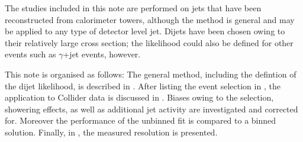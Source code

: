 The studies included in this note are performed on jets that have been reconstructed from calorimeter towers, although the method is general and may be applied to any type of detector level jet.
Dijets have been chosen owing to their relatively large cross section; the likelihood could also be defined for other events such as $\gamma$+jet events, however.

This note is organised as follows:
The general method, including the defintion of the dijet likelihood, is described in .
After listing the event selection in , the application to Collider data is discussed in .
Biases owing to the selection, showering effects, as well as additional jet activity are investigated and corrected for.
Moreover the performance of the unbinned fit is compared to a binned solution.
Finally, in , the measured resolution is presented.